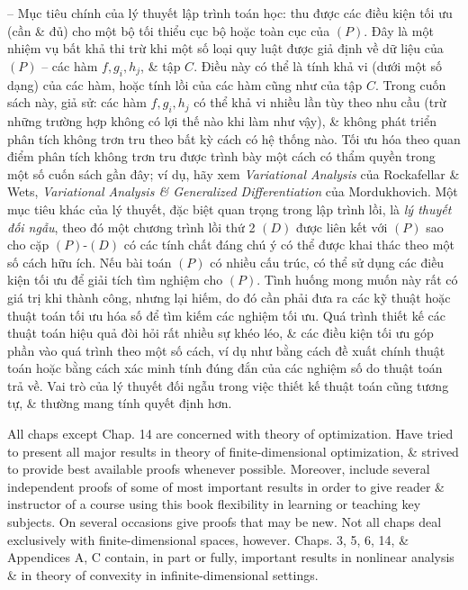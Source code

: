 \documentclass{article}
\begin{document}
\begin{itemize}
    -- Mục tiêu chính của lý thuyết lập trình toán học: thu được các điều kiện tối ưu (cần \& đủ) cho một bộ tối thiểu cục bộ hoặc toàn cục của $(P)$. Đây là một nhiệm vụ bất khả thi trừ khi một số loại quy luật được giả định về dữ liệu của $(P)$ -- các hàm $f,g_i,h_j$, \& tập $C$. Điều này có thể là tính khả vi (dưới một số dạng) của các hàm, hoặc tính lồi của các hàm cũng như của tập $C$. Trong cuốn sách này, giả sử: các hàm $f,g_i,h_j$ có thể khả vi nhiều lần tùy theo nhu cầu (trừ những trường hợp không có lợi thế nào khi làm như vậy), \& không phát triển phân tích không trơn tru theo bất kỳ cách có hệ thống nào. Tối ưu hóa theo quan điểm phân tích không trơn tru được trình bày một cách có thẩm quyền trong một số cuốn sách gần đây; ví dụ, hãy xem {\it Variational Analysis} của {\sc Rockafellar \& Wets}, {\it Variational Analysis \& Generalized Differentiation} của {\sc Mordukhovich}. Một mục tiêu khác của lý thuyết, đặc biệt quan trọng trong lập trình lồi, là {\it lý thuyết đối ngẫu}, theo đó một chương trình lồi thứ 2 $(D)$ được liên kết với $(P)$ sao cho cặp $(P)$-$(D)$ có các tính chất đáng chú ý có thể được khai thác theo một số cách hữu ích. Nếu bài toán $(P)$ có nhiều cấu trúc, có thể sử dụng các điều kiện tối ưu để giải tích tìm nghiệm cho $(P)$. Tình huống mong muốn này rất có giá trị khi thành công, nhưng lại hiếm, do đó cần phải đưa ra các kỹ thuật hoặc thuật toán tối ưu hóa số để tìm kiếm các nghiệm tối ưu. Quá trình thiết kế các thuật toán hiệu quả đòi hỏi rất nhiều sự khéo léo, \& các điều kiện tối ưu góp phần vào quá trình theo một số cách, ví dụ như bằng cách đề xuất chính thuật toán hoặc bằng cách xác minh tính đúng đắn của các nghiệm số do thuật toán trả về. Vai trò của lý thuyết đối ngẫu trong việc thiết kế thuật toán cũng tương tự, \& thường mang tính quyết định hơn.
    
    All chaps except Chap. 14 are concerned with theory of optimization. Have tried to present all major results in theory of finite-dimensional optimization, \& strived to provide best available proofs whenever possible. Moreover, include several independent proofs of some of most important results in order to give reader \& instructor of a course using this book flexibility in learning or teaching key subjects. On several occasions give proofs that may be new. Not all chaps deal exclusively with finite-dimensional spaces, however. Chaps. 3, 5, 6, 14, \& Appendices A, C contain, in part or fully, important results in nonlinear analysis \& in theory of convexity in infinite-dimensional settings.
    

\end{itemize}
\end{document}
